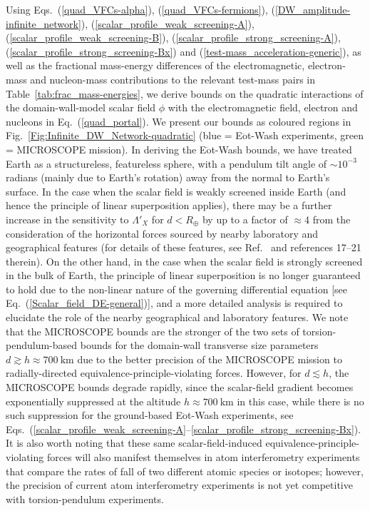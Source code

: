 \documentclass[aps,prd,onecolumn,nofootinbib]{revtex4-2} %
\begin{document}
Using Eqs.~(\ref{quad_VFCs-alpha}), (\ref{quad_VFCs-fermions}), (\ref{DW_amplitude-infinite_network}), (\ref{scalar_profile_weak_screening-A}), (\ref{scalar_profile_weak_screening-B}), (\ref{scalar_profile_strong_screening-A}), (\ref{scalar_profile_strong_screening-Bx}) and (\ref{test-mass_acceleration-generic}), as well as the fractional mass-energy differences of the electromagnetic, electron-mass and nucleon-mass contributions to the relevant test-mass pairs in Table~\ref{tab:frac_mass-energies}, we derive bounds on the quadratic interactions of the domain-wall-model scalar field $\phi$ with the electromagnetic field, electron and nucleons in Eq.~(\ref{quad_portal}). 
We present our bounds as coloured regions in Fig.~\ref{Fig:Infinite_DW_Network-quadratic} (blue = E$\ddot{\textrm{o}}$t-Wash experiments, green = MICROSCOPE mission). 
In deriving the E$\ddot{\textrm{o}}$t-Wash bounds, we have treated Earth as a structureless, featureless sphere, with a pendulum tilt angle of $\sim 10^{-3}$ radians (mainly due to Earth's rotation) away from the normal to Earth's surface. 
In the case when the scalar field is weakly screened inside Earth (and hence the principle of linear superposition applies), there may be a further increase in the sensitivity to $\Lambda'_X$ for $d < R_\oplus$ by up to a factor of $\approx 4$ from the consideration of the horizontal forces sourced by nearby laboratory and geographical features (for details of these features, see Ref.~\cite{Eot-Wash_2012_review} and references 17--21 therein). 
On the other hand, in the case when the scalar field is strongly screened in the bulk of Earth, the principle of linear superposition is no longer guaranteed to hold due to the non-linear nature of the governing differential equation [see Eq.~(\ref{Scalar_field_DE-general})], and a more detailed analysis is required to elucidate the role of the nearby geographical and laboratory features. 
We note that the MICROSCOPE bounds are the stronger of the two sets of torsion-pendulum-based bounds for the domain-wall transverse size parameters $d \gtrsim h \approx 700~\textrm{km}$ due to the better precision of the MICROSCOPE mission to radially-directed equivalence-principle-violating forces. 
However, for $d \lesssim h$, the MICROSCOPE bounds degrade rapidly, since the scalar-field gradient becomes exponentially suppressed at the altitude $h \approx 700~\textrm{km}$ in this case, while there is no such suppression for the ground-based E$\ddot{\textrm{o}}$t-Wash experiments, see Eqs.~(\ref{scalar_profile_weak_screening-A}--\ref{scalar_profile_strong_screening-Bx}). 
It is also worth noting that these same scalar-field-induced equivalence-principle-violating forces will also manifest themselves in atom interferometry experiments that compare the rates of fall of two different atomic species or isotopes; 
however, the precision of current atom interferometry experiments \cite{Rasel_2014_AI,Tino_2014_AI,Wuhan_2015_AI,Tino_2017_AI,Stanford_2020_AI} is not yet competitive with torsion-pendulum experiments. 
\end{document}
